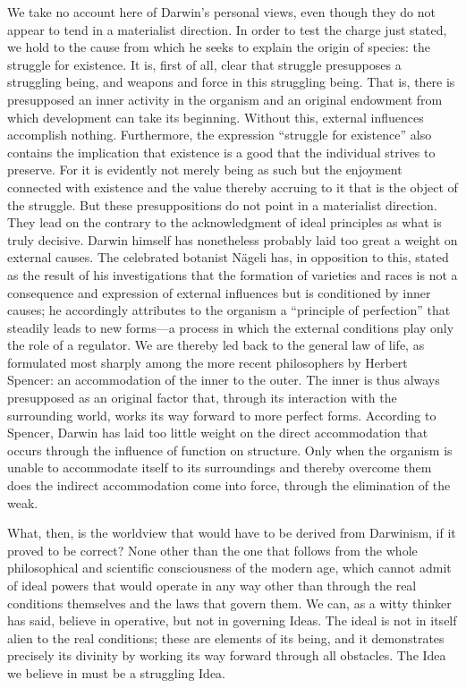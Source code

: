 \documentclass[12pt,a4paper]{article}
\begin{document}
We take no account here of Darwin's personal views, even though they
do not appear to tend in a materialist direction. In order to test the
charge just stated, we hold to the cause from which he seeks to explain
the origin of species: the struggle for existence. It is, first of
all, clear that struggle presupposes a struggling being, and weapons
and force in this struggling being. That is, there is presupposed an
inner activity in the organism and an original endowment from which
development can take its beginning. Without this, external influences
accomplish nothing. Furthermore, the expression ``struggle for
existence'' also contains the implication that existence is a good
that the individual strives to preserve. For it is evidently not
merely being as such but the enjoyment connected with existence and
the value thereby accruing to it that is the object of the struggle.
But these presuppositions do not point in a materialist direction.
They lead on the contrary to the acknowledgment of ideal principles
as what is truly decisive. Darwin himself has nonetheless probably
laid too great a weight on external causes. The celebrated botanist
Nägeli has, in opposition to this, stated as the result of his
investigations that the formation of varieties and races is not a
consequence and expression of external influences but is conditioned
by inner causes; he accordingly attributes to the organism a
``principle of perfection'' that steadily leads to new forms---a
process in which the external conditions play only the role of a
regulator. We are thereby led back to the general law of life, as
formulated most sharply among the more recent philosophers by Herbert
Spencer: an accommodation of the inner to the outer. The inner is
thus always presupposed as an original factor that, through its
interaction with the surrounding world, works its way forward to more
perfect forms. According to Spencer, Darwin has laid too little weight
on the direct accommodation that occurs through the influence of
function on structure. Only when the organism is unable to accommodate
itself to its surroundings and thereby overcome them does the indirect
accommodation come into force, through the elimination of the weak.

What, then, is the worldview that would have to be derived from
Darwinism, if it proved to be correct? None other than the one that
follows from the whole philosophical and scientific consciousness of
the modern age, which cannot admit of ideal powers that would operate
in any way other than through the real conditions themselves and the
laws that govern them. We can, as a witty thinker has said, believe
in operative, but not in governing Ideas. The ideal is not in itself
alien to the real conditions; these are elements of its being, and it
demonstrates precisely its divinity by working its way forward through
all obstacles. The Idea we believe in must be a struggling Idea.
\end{document}
